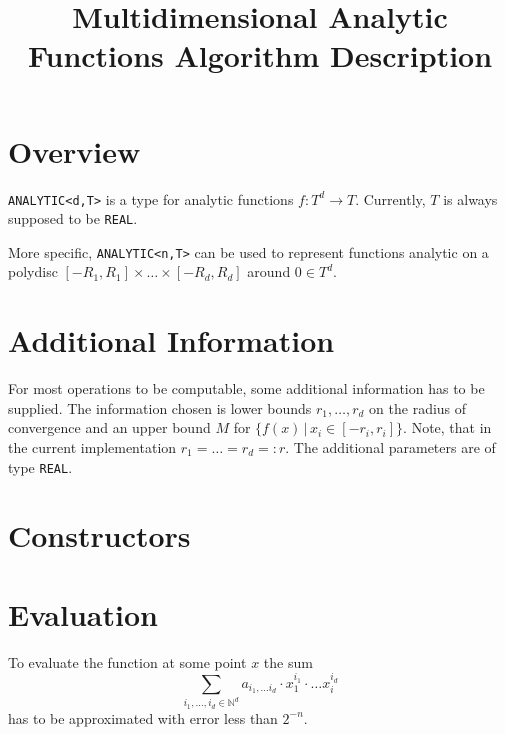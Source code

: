 \documentclass[]{article}
\title{Multidimensional Analytic Functions Algorithm Description}
\newcommand{\NN}{\mathbb N}
\newcommand{\code}{\texttt}
\begin{document}
\section{Overview}
\code{ANALYTIC<d,T>} is a type for analytic functions $f: T^d \to T$.
Currently, $T$ is always supposed to be \code{REAL}.

More specific, \code{ANALYTIC<n,T>} can be used to represent functions analytic on a polydisc $[-R_1,R_1] \times \dots \times [-R_d, R_d]$ around $0 \in T^d$. 
\section{Additional Information}
For most operations to be computable, some additional information has to be supplied.
The information chosen is lower bounds $r_1, \dots, r_d$ on the radius of convergence and an upper bound $M$ for $\{f(x) \, | \, x_i \in [-r_i, r_i]\}$.  
Note, that in the current implementation $r_1 = \dots = r_d =: r$.
The additional parameters are of type \code{REAL}.
\section{Constructors}

\section{Evaluation}
To evaluate the function at some point $x$ the sum
$$ \sum_{i_1, \dots, i_d \in \NN^d} a_{i_1, \dots i_d} \cdot x_1^{i_1} \cdot \dots x_i^{i_d} $$
has to be approximated with error less than $2^{-n}$.
\end{document}
